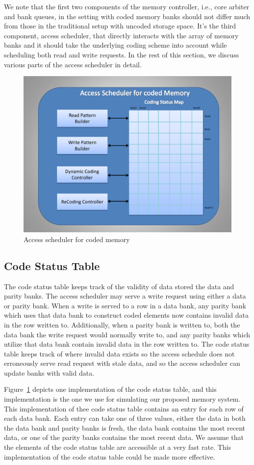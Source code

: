 {\color{red} We note that the first two components of the memory controller, i.e., core arbiter and bank queues, in the setting with coded memory banks should not differ much from those in the traditional setup with uncoded storage space. It's the third component, access scheduler, that directly interacts with the array of memory banks and it should take the underlying coding scheme into account while scheduling both read and write requests.} In the rest of this section, we discuss various parts of the access scheduler in detail.

\begin{figure}[tbp]
\centering
\includegraphics[width=0.7\linewidth]{fig/coded_access_scheduler.pdf}
\caption{
{Access scheduler for coded memory} }
\label{fig:coded_access_scheduler}
\end{figure}
\subsection{Code Status Table}
\label{sec:codeStatusTable}
The code status table keeps track of the validity of data stored the data and parity banks. The access scheduler may serve a write request using either a data or parity bank. When a write is served to a row in a data bank, any parity bank which uses that data bank to construct coded elements now contains invalid data in the row written to. Additionally, when a parity bank is written to, both the data bank the write request would normally write to, and any parity banks which utilize that data bank contain invalid data in the row written to. The code status table keeps track of where invalid data exists so the access schedule does not erroneously serve read request with stale data, and so the access scheduler can update banks with valid data. 

Figure~\ref{fig:coded_access_scheduler} depicts one implementation of the code status table, and this implementation is the one we use for simulating our proposed memory system. This implementation of thee code status table contains an entry for each row of each data bank. Each entry can take one of three values, either the data in both the data bank and parity banks is fresh, the data bank contains the most recent data, or one of the parity banks contains the most recent data. We assume that the elements of the code status table are accessible at a very fast rate. This implementation of the code status table could be made more effective. 

